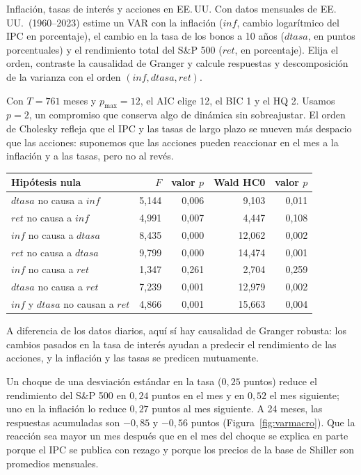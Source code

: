 \begin{ejresuelto}{Inflación, tasas de interés y acciones en EE.\,UU.}\label{ej:varmacro}
\enunciado Con datos mensuales de EE.\,UU.\ (1960--2023) estime un VAR con la inflación ($\mathit{inf}$, cambio
logarítmico del IPC en porcentaje), el cambio en la tasa de los bonos a 10 años ($\mathit{dtasa}$, en puntos
porcentuales) y el rendimiento total del S\&P 500 ($\mathit{ret}$, en porcentaje). Elija el orden, contraste la
causalidad de Granger y calcule respuestas y descomposición de la varianza con el orden
$(\mathit{inf},\mathit{dtasa},\mathit{ret})$.

\solucion
{} Con $T=761$ meses y $p_{\max}=12$, el AIC elige 12, el BIC 1 y el HQ 2. Usamos $p=2$,
un compromiso que conserva algo de dinámica sin sobreajustar. El orden de Cholesky refleja que el IPC y las tasas
de largo plazo se mueven más despacio que las acciones: suponemos que las acciones pueden reaccionar en el mes
a la inflación y a las tasas, pero no al revés.

\begin{center}\small
\begin{tabular}{@{}lrrrr@{}}
\toprule
Hipótesis nula & $F$ & valor $p$ & Wald HC0 & valor $p$ \\
\midrule
$\mathit{dtasa}$ no causa a $\mathit{inf}$ & 5,144 & 0,006 & 9,103 & 0,011 \\
$\mathit{ret}$ no causa a $\mathit{inf}$ & 4,991 & 0,007 & 4,447 & 0,108 \\
$\mathit{inf}$ no causa a $\mathit{dtasa}$ & 8,435 & 0,000 & 12,062 & 0,002 \\
$\mathit{ret}$ no causa a $\mathit{dtasa}$ & 9,799 & 0,000 & 14,474 & 0,001 \\
$\mathit{inf}$ no causa a $\mathit{ret}$ & 1,347 & 0,261 & 2,704 & 0,259 \\
$\mathit{dtasa}$ no causa a $\mathit{ret}$ & 7,239 & 0,001 & 12,979 & 0,002 \\
$\mathit{inf}$ y $\mathit{dtasa}$ no causan a $\mathit{ret}$ & 4,866 & 0,001 & 15,663 & 0,004 \\
\bottomrule
\end{tabular}
\end{center}
A diferencia de los datos diarios, aquí sí hay causalidad de Granger robusta: los cambios pasados en la tasa de
interés ayudan a predecir el rendimiento de las acciones, y la inflación y las tasas se predicen mutuamente.

 Un choque de una desviación estándar en la tasa
($0{,}25$ puntos) reduce el rendimiento del S\&P 500 en $0{,}24$ puntos en el mes y en $0{,}52$ el mes
siguiente; uno en la inflación lo reduce $0{,}27$ puntos al mes siguiente. A 24 meses, las respuestas acumuladas
son $-0{,}85$ y $-0{,}56$ puntos (Figura~\ref{fig:varmacro}). Que la reacción sea mayor un mes después que en el
mes del choque se explica en parte porque el IPC se publica con rezago y porque los precios de la base de
Shiller son promedios mensuales.


\end{ejresuelto}
